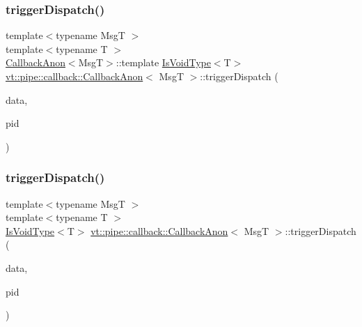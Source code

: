 \subsubsection{\texorpdfstring{trigger\+Dispatch()}{triggerDispatch()}\hspace{0.1cm}{\footnotesize\ttfamily [1/4]}}
{\footnotesize\ttfamily template$<$typename MsgT $>$ \\
template$<$typename T $>$ \\
\hyperlink{structvt_1_1pipe_1_1callback_1_1_callback_anon}{Callback\+Anon}$<$MsgT$>$\+::template \hyperlink{structvt_1_1pipe_1_1callback_1_1_callback_anon_a3aa19d4a1044d57ba4af22015331c20a}{Is\+Void\+Type}$<$T$>$ \hyperlink{structvt_1_1pipe_1_1callback_1_1_callback_anon}{vt\+::pipe\+::callback\+::\+Callback\+Anon}$<$ MsgT $>$\+::trigger\+Dispatch (\begin{DoxyParamCaption}\item[{\mbox{[}\mbox{[}maybe\+\_\+unused\mbox{]} \mbox{]} \hyperlink{structvt_1_1pipe_1_1callback_1_1_callback_anon_ac503b95feb44bb0b60c1d69e1ed29074}{Signal\+Data\+Type} $\ast$}]{data,  }\item[{\hyperlink{namespacevt_ac9852acda74d1896f48f406cd72c7bd3}{Pipe\+Type} const \&}]{pid }\end{DoxyParamCaption})}

\mbox{\label{structvt_1_1pipe_1_1callback_1_1_callback_anon_a71cd1781a5f639ddf5e2aac775c1d397}} 
\subsubsection{\texorpdfstring{trigger\+Dispatch()}{triggerDispatch()}\hspace{0.1cm}{\footnotesize\ttfamily [2/4]}}
{\footnotesize\ttfamily template$<$typename MsgT $>$ \\
template$<$typename T $>$ \\
\hyperlink{structvt_1_1pipe_1_1callback_1_1_callback_anon_a3aa19d4a1044d57ba4af22015331c20a}{Is\+Void\+Type}$<$T$>$ \hyperlink{structvt_1_1pipe_1_1callback_1_1_callback_anon}{vt\+::pipe\+::callback\+::\+Callback\+Anon}$<$ MsgT $>$\+::trigger\+Dispatch (\begin{DoxyParamCaption}\item[{\hyperlink{structvt_1_1pipe_1_1callback_1_1_callback_anon_ac503b95feb44bb0b60c1d69e1ed29074}{Signal\+Data\+Type} $\ast$}]{data,  }\item[{\hyperlink{namespacevt_ac9852acda74d1896f48f406cd72c7bd3}{Pipe\+Type} const \&}]{pid }\end{DoxyParamCaption})\hspace{0.3cm}{\ttfamily [private]}}


